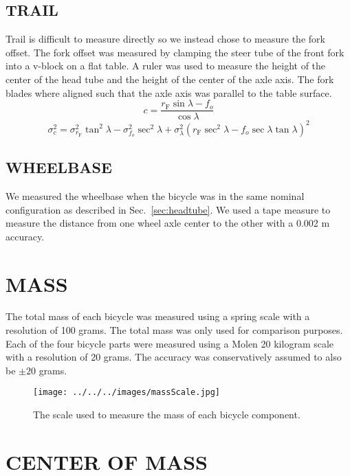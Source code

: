 \documentclass{bmd2010p}
\begin{document}
\subsection{TRAIL}
Trail is difficult to measure directly so we instead chose to measure the fork
offset. The fork offset was measured by clamping the steer tube of the front
fork into a v-block on a flat table. A ruler was used to measure the height of
the center of the head tube and the height of the center of the axle axis. The
fork blades where aligned such that the axle axis was parallel to the table
surface.
\begin{equation}
	c=\frac{r_\mathrm{F}\sin{\lambda}-f_o}{\cos{\lambda}}
	\label{eq:trail}
\end{equation}
\begin{equation}
    \sigma_{c}^{2}=\sigma_{r_{\mathrm{F}}}^{2}\tan^2{\lambda} -
    \sigma_{f_o}^{2}\sec^2{\lambda} +
    \sigma_{\lambda}^{2}\left(r_\mathrm{F}\sec^2{\lambda} -
    f_o\sec{\lambda}\tan{\lambda}\right)^2
    \label{eq:TrailVar}
\end{equation}
\subsection{WHEELBASE}
We measured the wheelbase when the bicycle was in the same nominal
configuration as described in Sec.~\ref{sec:headtube}. We used a tape measure
to measure the distance from one wheel axle center to the other with a 0.002 m
accuracy.
\section{MASS}
The total mass of each bicycle was measured using a spring scale with a
resolution of 100 grams. The total mass was only used for comparison purposes.
Each of the four bicycle parts were measured using a Molen 20 kilogram scale with a
resolution of 20 grams. The accuracy was conservatively assumed to also be
$\pm20$ grams.
\begin{figure}[htbp]
    \begin{center}
        \texttt{[image: ../../../images/massScale.jpg]}
    \end{center}
    \caption{The scale used to measure the mass of each bicycle component.}
    \label{fig:massScale}
\end{figure}
\section{CENTER OF MASS}
\end{document}
